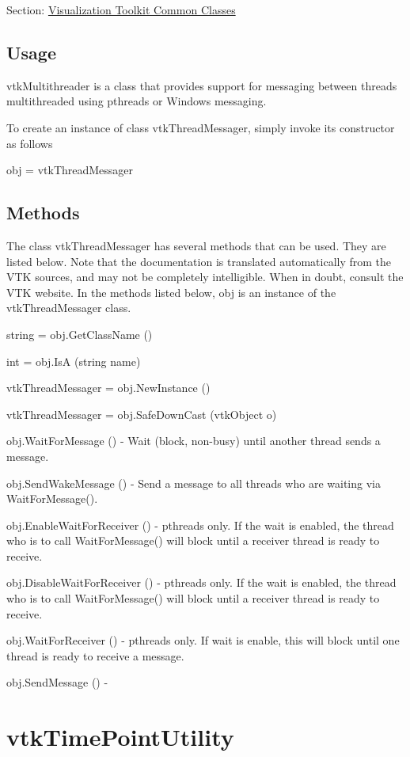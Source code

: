 Section\-: \hyperlink{sec_vtkcommon}{Visualization Toolkit Common Classes} \hypertarget{vtkwidgets_vtkxyplotwidget_Usage}{}\subsection{Usage}\label{vtkwidgets_vtkxyplotwidget_Usage}
vtk\-Multithreader is a class that provides support for messaging between threads multithreaded using pthreads or Windows messaging.

To create an instance of class vtk\-Thread\-Messager, simply invoke its constructor as follows \begin{DoxyVerb}  obj = vtkThreadMessager
\end{DoxyVerb}
 \hypertarget{vtkwidgets_vtkxyplotwidget_Methods}{}\subsection{Methods}\label{vtkwidgets_vtkxyplotwidget_Methods}
The class vtk\-Thread\-Messager has several methods that can be used. They are listed below. Note that the documentation is translated automatically from the V\-T\-K sources, and may not be completely intelligible. When in doubt, consult the V\-T\-K website. In the methods listed below, {\ttfamily obj} is an instance of the vtk\-Thread\-Messager class. 
\begin{DoxyItemize}
\item {\ttfamily string = obj.\-Get\-Class\-Name ()}  
\item {\ttfamily int = obj.\-Is\-A (string name)}  
\item {\ttfamily vtk\-Thread\-Messager = obj.\-New\-Instance ()}  
\item {\ttfamily vtk\-Thread\-Messager = obj.\-Safe\-Down\-Cast (vtk\-Object o)}  
\item {\ttfamily obj.\-Wait\-For\-Message ()} -\/ Wait (block, non-\/busy) until another thread sends a message.  
\item {\ttfamily obj.\-Send\-Wake\-Message ()} -\/ Send a message to all threads who are waiting via Wait\-For\-Message().  
\item {\ttfamily obj.\-Enable\-Wait\-For\-Receiver ()} -\/ pthreads only. If the wait is enabled, the thread who is to call Wait\-For\-Message() will block until a receiver thread is ready to receive.  
\item {\ttfamily obj.\-Disable\-Wait\-For\-Receiver ()} -\/ pthreads only. If the wait is enabled, the thread who is to call Wait\-For\-Message() will block until a receiver thread is ready to receive.  
\item {\ttfamily obj.\-Wait\-For\-Receiver ()} -\/ pthreads only. If wait is enable, this will block until one thread is ready to receive a message.  
\item {\ttfamily obj.\-Send\-Message ()} -\/  
\end{DoxyItemize}\hypertarget{vtkcommon_vtktimepointutility}{}\section{vtk\-Time\-Point\-Utility}\label{vtkcommon_vtktimepointutility}
